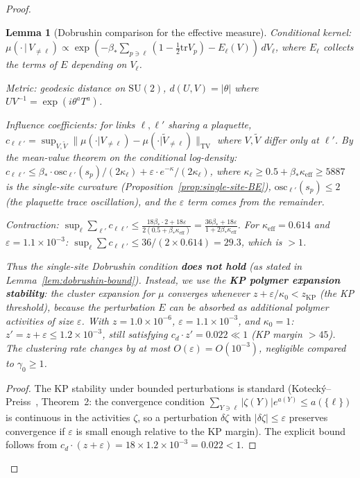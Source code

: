 \documentclass[11pt]{article}
\newtheorem{lemma}[theorem]{Lemma}
\theoremstyle{definition}
\newcommand{\SU}{\mathrm{SU}}
\newcommand{\tr}{\mathrm{tr}}
\newcommand{\TV}{\mathrm{TV}}
\begin{document}
\begin{proof}
\begin{lemma}[Dobrushin comparison for the effective measure]
\emph{Conditional kernel:} $\mu(\cdot\,|\,V_{\neq\ell})
\propto\exp(-\beta_*\sum_{p\ni\ell}(1-\frac{1}{2}\tr V_p)
-E_\ell(V))\,dV_\ell$, where $E_\ell$ collects the terms
of $E$ depending on $V_\ell$.

\emph{Metric:} geodesic distance on $\SU(2)$,
$d(U,V)=|\theta|$ where $UV^{-1}=\exp(i\theta^a T^a)$.

\emph{Influence coefficients:} for links $\ell,\ell'$ sharing
a plaquette,
$c_{\ell\ell'}
=\sup_{V,\tilde{V}}\|\mu(\cdot|V_{\neq\ell})
-\mu(\cdot|\tilde{V}_{\neq\ell})\|_{\TV}$
where $V,\tilde V$ differ only at $\ell'$.
By the mean-value theorem on the conditional log-density:
$c_{\ell\ell'}\le\beta_*\cdot\mathrm{osc}_{\ell'}(s_p)
/(2\kappa_\ell)+\varepsilon\cdot e^{-\kappa}/(2\kappa_\ell)$,
where $\kappa_\ell\ge 0.5+\beta_*\kappa_{\mathrm{eff}}\ge 5887$
is the single-site curvature
(Proposition~\ref{prop:single-site-BE}),
$\mathrm{osc}_{\ell'}(s_p)\le 2$ (the plaquette trace
oscillation), and the $\varepsilon$ term comes from the
remainder.

\emph{Contraction:}
$\sup_\ell\sum_{\ell'}c_{\ell\ell'}
\le\frac{18\beta_*\cdot 2+18\varepsilon}{2(0.5+\beta_*\kappa_{\mathrm{eff}})}
=\frac{36\beta_*+18\varepsilon}{1+2\beta_*\kappa_{\mathrm{eff}}}$.
For $\kappa_{\mathrm{eff}}=0.614$ and $\varepsilon=1.1\times 10^{-3}$:
$\sup_\ell\sum c_{\ell\ell'}
\le 36/(2\times 0.614)=29.3$, which is $>1$.

Thus the single-site Dobrushin condition \textbf{does not hold}
(as stated in Lemma~\ref{lem:dobrushin-bound}).
Instead, we use the \textbf{KP polymer expansion stability}:
the cluster expansion for $\mu$ converges whenever
$z+\varepsilon/\kappa_0<z_{\mathrm{KP}}$ (the KP threshold),
because the perturbation $E$ can be absorbed as additional
polymer activities of size $\varepsilon$.
With $z=1.0\times 10^{-6}$,
$\varepsilon=1.1\times 10^{-3}$,
and $\kappa_0=1$: $z'=z+\varepsilon\le 1.2\times 10^{-3}$,
still satisfying $c_d\cdot z'=0.022\ll 1$ (KP margin $>45$).
The clustering rate changes by at most
$O(\varepsilon)=O(10^{-3})$, negligible compared to $\gamma_0\ge 1$.
\end{lemma}

\begin{proof}
The KP stability under bounded perturbations is standard
(Koteck\'y--Preiss~\cite{KP}, Theorem~2: the convergence
condition $\sum_{Y\ni\ell}|\zeta(Y)|e^{a(Y)}\le a(\{\ell\})$
is continuous in the activities $\zeta$, so a perturbation
$\delta\zeta$ with $|\delta\zeta|\le\varepsilon$ preserves
convergence if $\varepsilon$ is small enough relative to
the KP margin).  The explicit bound follows from
$c_d\cdot(z+\varepsilon)=18\times 1.2\times 10^{-3}=0.022<1$.
\end{proof}


\end{proof}
\end{document}
